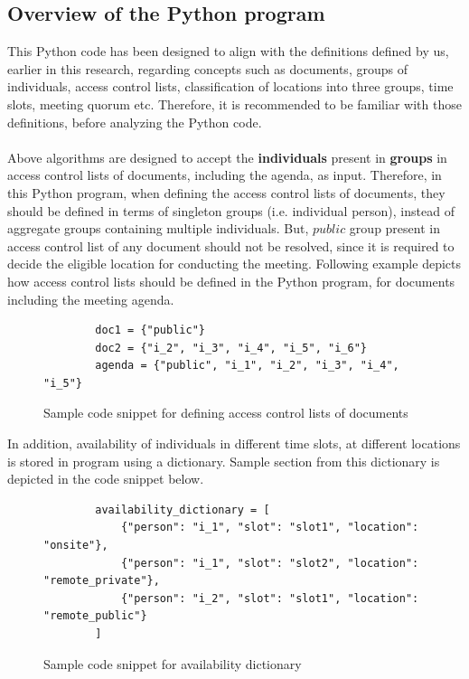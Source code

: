 \subsection{Overview of the Python program}
This Python code has been designed to align with the definitions defined by us, earlier in this research, regarding concepts such as documents, groups of individuals, access control lists, classification of locations into three groups, time slots, meeting quorum etc. Therefore, it is recommended to be familiar with those definitions, before analyzing the Python code.\\ \\
Above algorithms are designed to accept the \textbf{individuals} present in \textbf{groups} in access control lists of documents, including the agenda, as input. Therefore, in this Python program, when defining the access control lists of documents, they should be defined in terms of singleton groups (i.e. individual person), instead of aggregate groups containing multiple individuals. But, $public$ group present in access control list of any document should not be resolved, since it is required to decide the eligible location for conducting the meeting. Following example depicts how access control lists should be defined in the Python program, for documents including the meeting agenda.\\ 
\begin{figure}[H] 
    \centering
    \begin{verbatim}
        doc1 = {"public"}
        doc2 = {"i_2", "i_3", "i_4", "i_5", "i_6"}
        agenda = {"public", "i_1", "i_2", "i_3", "i_4", "i_5"}
    \end{verbatim}
    \caption{Sample code snippet for defining access control lists of documents}
    \label{fig:sample code snippet for defining access control lists of documents}
\end{figure}
In addition, availability of individuals in different time slots, at different locations is stored in program using a dictionary. Sample section from this dictionary is depicted in the code snippet below.\\ 
\begin{figure}[H]  
    \centering
    \begin{verbatim}
        availability_dictionary = [
            {"person": "i_1", "slot": "slot1", "location": "onsite"},
            {"person": "i_1", "slot": "slot2", "location": "remote_private"},
            {"person": "i_2", "slot": "slot1", "location": "remote_public"}
        ]
    \end{verbatim}
    \caption{Sample code snippet for availability dictionary}
    \label{fig:sample code snippet for availability dictionary}
\end{figure}


